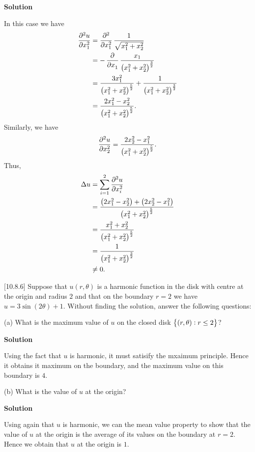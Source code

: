 \documentclass{article}
\begin{document}
\textbf{Solution}

In this case we have
%
\begin{align*}
    \dpd[2]{u}{x_1}
        &= \dpd[2]{}{x_1} \frac{1}{\sqrt{x_1^2 + x_2^2}} \\
        &= - \dpd{}{x_1} \frac{x_1}{\del{x_1^2 + x_2^2}^\frac{3}{2}} \\
        &= \frac{3 x_1^2}{\del{x_1^2 + x_2^2}^\frac{5}{2}}
           + \frac{1}{\del{x_1^2 + x_2^2}^\frac{3}{2}} \\
        &= \frac{2 x_1^2 - x_2^2}{\del{x_1^2 + x_2^2}^\frac{5}{2}}
        .
\end{align*}
%
Similarly, we have
%
\begin{equation*}
    \dpd[2]{u}{x_2}
        = \frac{2 x_2^2 - x_1^2}{\del{x_1^2 + x_2^2}^\frac{5}{2}}
    .
\end{equation*}
%
Thus,
%
\begin{align*}
    \Delta u
        &= \sum_{i = 1}^2 \dpd[2]{u}{x_i} \\
        &= \frac{
            \del{2 x_1^2 - x_2^2}
            + \del{2 x_2^2 - x_1^2}
            }{\del{x_1^2 + x_2^2}^\frac{5}{2}} \\
        &= \frac{x_1^2 + x_2^2}{\del{x_1^2 + x_2^2}^\frac{5}{2}} \\
        &= \frac{1}{\del{x_1^2 + x_2^2}^\frac{3}{2}} \\
        &\neq 0
        .
\end{align*}

\vspace{5mm}

[10.8.6] Suppose that $u(r, \theta)$ is a harmonic function in the disk
with centre at the origin and radius $2$ and that on the boundary $r =
2$ we have $u = 3 \sin (2 \theta) + 1$. Without finding the solution,
answer the following questions:

(a) What is the maximum value of $u$ on the closed disk $\cbr{(r,
\theta) : r \leq 2}$?

\textbf{Solution}

Using the fact that $u$ is harmonic, it must satisify the mxaimum
principle. Hence it obtains it maximum on the boundary, and the maximum
value on this boundary is $4$.

\vspace{5mm}

(b) What is the value of $u$ at the origin?

\textbf{Solution}

Using again that $u$ is harmonic, we can the mean value property to show
that the value of $u$ at the origin is the average of its values on the
boundary at $r = 2$. Hence we obtain that $u$ at the origin is $1$.
\end{document}
